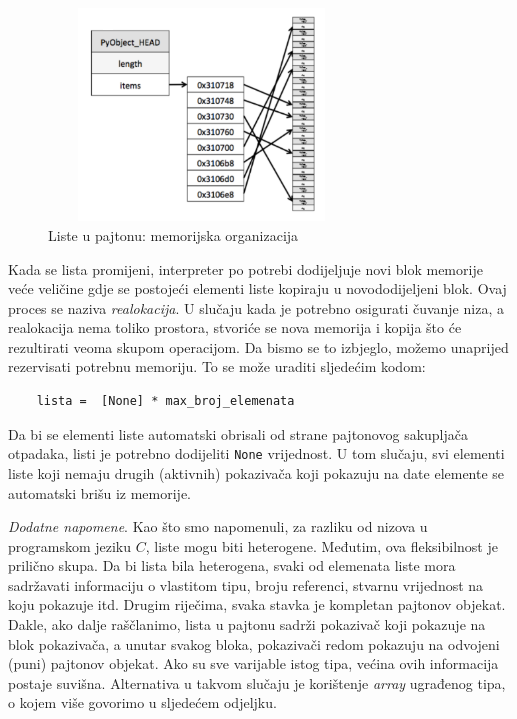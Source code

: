  \begin{figure}[!ht]
	\centering
	\includegraphics[width=230pt,height=160pt]{slike/list_mem_org.png}

	\caption{Liste u pajtonu: memorijska organizacija} 	\label{fig: mem_list_org}
\end{figure}




 Kada se lista promijeni, interpreter po potrebi dodijeljuje novi blok memorije veće veličine gdje se postojeći elementi liste kopiraju u novododijeljeni blok. Ovaj proces se naziva \textit{realokacija}.  U slučaju kada je potrebno osigurati čuvanje niza, a realokacija nema toliko prostora, stvoriće se nova memorija i kopija što će rezultirati veoma skupom operacijom. Da bismo se to izbjeglo, možemo unaprijed rezervisati potrebnu memoriju. To se može uraditi sljedećim kodom:
 \begin{verbatim}
    lista =  [None] * max_broj_elemenata
 \end{verbatim}

Da bi se elementi liste automatski obrisali od strane pajtonovog sakupljača otpadaka, listi je potrebno dodijeliti \texttt{None} vrijednost.  U tom slučaju, svi elementi liste koji nemaju drugih (aktivnih) pokazivača koji pokazuju na date elemente se automatski brišu iz memorije. 

\textit{Dodatne napomene}. Kao što smo napomenuli, za razliku od nizova u programskom jeziku $C$, liste mogu biti heterogene. Međutim, ova fleksibilnost je prilično skupa. Da bi lista bila heterogena, svaki od elemenata liste mora sadržavati informaciju o vlastitom tipu, broju referenci, stvarnu vrijednost na koju pokazuje itd. Drugim riječima, svaka stavka je kompletan pajtonov objekat. Dakle, ako   dalje raščlanimo, lista u pajtonu sadrži pokazivač koji   pokazuje na   blok pokazivača, a unutar svakog bloka,  pokazivači redom pokazuju na odvojeni (puni) pajtonov objekat.  Ako su sve varijable istog tipa, većina ovih informacija postaje suvišna. Alternativa u takvom slučaju je korištenje \textit{array} ugrađenog tipa, o kojem više govorimo u sljedećem odjeljku.   %

